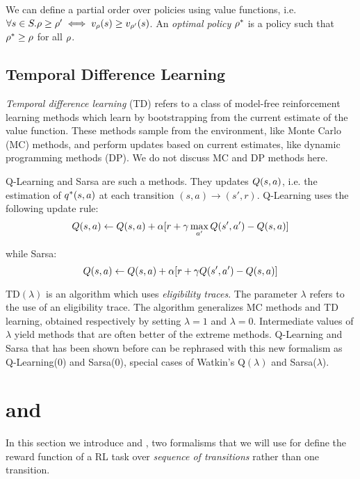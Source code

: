 We can define a partial order over policies using value functions, i.e. $\forall s\in S. \rho \ge \rho' \iff v_\rho(s) \ge v_{\rho'}(s)$. An \emph{optimal policy} $\rho^*$ is a policy such that $\rho^* \ge \rho$ for all $\rho$. 


\subsection{Temporal Difference Learning}

\emph{Temporal difference learning} (TD) refers to a class of model-free reinforcement learning methods which learn by bootstrapping from the current estimate of the value function. These methods sample from the environment, like Monte Carlo (MC) methods, and perform updates based on current estimates, like dynamic programming methods (DP). We do not discuss MC and DP methods here.

Q-Learning and Sarsa are such a methods. They updates $Q(s, a)$, i.e. the estimation of $q^*(s, a)$ at each transition $(s, a) \to (s', r)$. Q-Learning uses the following update rule:
\begin{equation}
Q(s, a) \leftarrow Q(s, a) + \alpha [r + \gamma \max_{a'} Q(s', a') - Q(s, a)]
\end{equation}

while Sarsa:
\begin{equation}
Q(s, a) \leftarrow Q(s, a) + \alpha [r + \gamma Q(s', a') - Q(s, a)]
\end{equation}

TD$(\lambda)$ is an algorithm which uses \emph{eligibility traces}. The parameter $\lambda$ refers to the use of an eligibility trace. The algorithm generalizes MC methods and TD learning, obtained respectively by setting $\lambda = 1$ and $\lambda = 0$. Intermediate values of $\lambda$ yield methods that are often better of the extreme methods. Q-Learning and Sarsa that has been shown before can be rephrased with this new formalism as Q-Learning(0) and Sarsa(0), special cases of Watkin's Q$(\lambda)$ and Sarsa($\lambda$).

\section{\LTLf and \LDLf}
In this section we introduce \LTLf and \LDLf, two formalisms that we will use for define the reward function of a RL task over \emph{sequence of transitions} rather than one transition.


